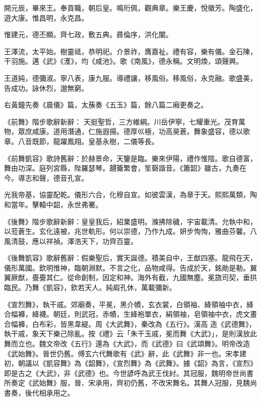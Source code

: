 \begin{pinyinscope}
 開元辰，畢來王。奉貢職，朝后皇。鳴珩佩，觀典章。樂王慶，悅徽芳。陶盛化，遊大康。惟昌明，永克昌。



 惟建元，德丕顯。齊七政，敷五典。彞倫序，洪化闡。



 王澤流，太平始。樹靈祗，恭明祀。介景祚，膺嘉祉。禮有容，樂有儀。金石陳，干羽施。邁《武》《濩》，均《咸池》。歌《南風》，德永稱。文明煥，頌聲興。



 王道純，德彌淑。寧八表，康九服。導禮讓，移風俗。移風俗，永克融。歌盛美，告成功。詠休烈，邈無窮。



 右黃鐘先奏《晨儀》篇，太蔟奏《五玉》篇，餘八篇二廂更奏之。



 《前舞》階步歌辭新辭：
 天挺聖哲，三方維綱。川岳伊寧，七耀重光。茂育萬物，眾庶咸康。道用潛通，仁施遐揚。德厚巛極，功高昊蒼。舞象盛容，德以歌章。八音既節，龍躍鳳翔。皇基永樹，二儀等長。



 《前舞凱容》歌詩舊辭：於赫景命，天鑒是臨。樂來伊陽，禮作惟陰。歌自德富，舞由功深。庭列宮縣，陛羅瑟琴。翿籥繁會，笙磬諧音。《簫韶》雖古，九奏在今。導志和聲，德音孔宣。



 光我帝基，協靈配乾。儀形六合，化穆自宣。如彼雲漢，為章于天。熙熙萬類，陶和當年。擊轅中韶，永世弗騫。



 《後舞》階步歌辭新辭：皇皇我后，紹業盛明。滌拂除穢，宇宙載清。允執中和，
 以蒞蒼生。玄化遠被，兆世軌形。何以崇德，乃作九成。妍步恂恂，雅曲芬馨。八風清鼓，應以祥禎。澤浩天下，功齊百靈。



 《後舞凱容》歌辭舊辭：假樂聖后，實天誕德。積美自中，王猷四塞。龍飛在天，儀形萬國。欽明惟神，臨朝淵默。不言之化，品物咸得。告成於天，銘勛是勒。翼翼厥猷，亹亹其仁。從命創制，因定和神。海外有截，九國無塵。冕旒司契，垂拱臨民。乃舞《凱容》，欽若天人。純嘏孔休，萬載彌新。



 《宣烈舞》，執干戚。郊廟奏，平冕，黑介幘，玄衣裳，白領袖、絳領袖中衣，絳合幅褲，絳襪。朝廷，則武冠，赤幘，生絳袍單衣，絹領袖，皂領袖中衣，虎文畫合幅褲，白布彩，皆黑韋緹。周《大武舞》，秦改為《五行》。漢高
 造《武德舞》，執干戚，象天下樂己除亂。按《禮》云「朱干玉戚，冕而舞《大武》」，是則漢放此舞而立也。魏文帝改《五行》還為《大武》，而《武德》曰《武頌舞》。明帝改造《武始舞》。晉世仍舊。傅玄六代舞歌有《武》辭，此《武舞》非一也。宋孝建初，朝議以《凱容舞》為《韶舞》，《宣烈舞》為《武舞》。據《韶》為言，《宣烈》即是古之《大武》，非《武德》也。今世諺呼為武王伐紂。其冠服，魏明帝世尚書所奏定《武始舞》服，晉、宋承用，齊初仍舊，不改宋舞名。其舞人冠服，見魏尚書奏，後代相承用之。




\end{pinyinscope}
